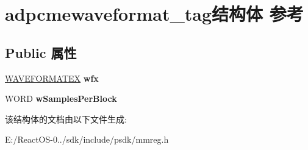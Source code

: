 \hypertarget{structadpcmewaveformat__tag}{}\section{adpcmewaveformat\+\_\+tag结构体 参考}
\label{structadpcmewaveformat__tag}
\subsection*{Public 属性}
\begin{DoxyCompactItemize}
\item 
\mbox{\label{structadpcmewaveformat__tag_a3a12f5a2425230a3f2562e59133312c9}} 
\hyperlink{struct_w_a_v_e_f_o_r_m_a_t_e_x}{W\+A\+V\+E\+F\+O\+R\+M\+A\+T\+EX} {\bfseries wfx}
\item 
\mbox{\label{structadpcmewaveformat__tag_a6be0dbed4e026937ee028c5fbd8836c7}} 
W\+O\+RD {\bfseries w\+Samples\+Per\+Block}
\end{DoxyCompactItemize}


该结构体的文档由以下文件生成\+:\begin{DoxyCompactItemize}
\item 
E\+:/\+React\+O\+S-\/0../sdk/include/psdk/mmreg.\+h\end{DoxyCompactItemize}
